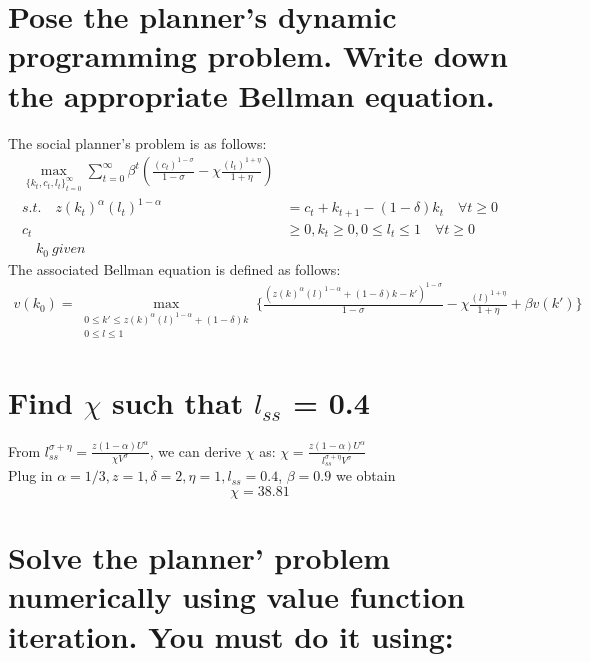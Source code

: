 \documentclass[12pt,a4paper]{article}
\begin{document}
     \section{Pose the planner’s dynamic programming problem. Write down the appropriate
Bellman equation.}

The social planner's problem is as follows:
\begin{equation}
\begin{split}
\max\limits_{\{k_{t}, c_{t}, l_{t}\}^{\infty}_{t=0}} \sum_{t=0}^{\infty} \beta^t(\frac{(c_{t})^{1-\sigma}}{1-\sigma}-\chi \frac{(l_{t})^{1+\eta}}{1+\eta}) \\
    s.t. \quad z(k_t)^{\alpha}(l_t)^{1-\alpha} &= c_t+k_{t+1}-(1-\delta)k_t \quad \forall t\geq0\\
    c_t &\geq 0, k_t \geq 0, 0 \leq l_t \leq 1 \quad \forall t\geq0\\
     \quad {k}_{0}\:given
\end{split}
\end{equation}
The associated Bellman equation is defined as follows:
\begin{equation}
\begin{split}
v(k_0) = \max\limits_{\begin{smallmatrix}0\leq k' \leq z(k)^{\alpha}(l)^{1-\alpha}+ (1-\delta)k\\ 0\leq l \leq 1\end{smallmatrix}} \{\frac{(z(k)^{\alpha}(l)^{1-\alpha}+ (1-\delta)k-k')^{1-\sigma}}{1-\sigma}-\chi \frac{(l)^{1+\eta}}{1+\eta}+\beta v(k')\}
\end{split}
\end{equation}

\section{Find $\chi$ such that $l_{ss}$ = 0.4}

From $l_{ss}^{\sigma+\eta} =\frac{z(1-\alpha)U^{\alpha}}{\chi V^{\sigma}}$, we can derive $\chi $ as: $\chi = \frac{z(1-\alpha)U^{\alpha}}{l_{ss}^{\sigma+\eta} V^{\sigma}}$ \\


Plug in $\alpha=1/3,z=1,\delta=2,\eta=1,l_{ss}=0.4$, $\beta=0.9$ we obtain
\begin{equation}
\chi = 38.81
\end{equation}

\section{Solve the planner’ problem numerically using value function iteration. You must do it using:}
\end{document}
